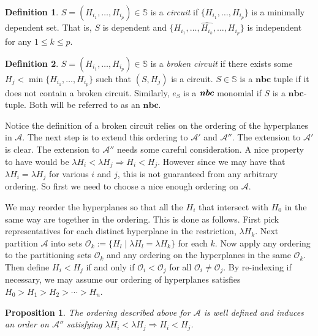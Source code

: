 \documentclass[article,twoside]{article}
\newcommand{\BB}[1]{\mathbb{#1}}
\newcommand{\script}[1]{\mathcal{#1}}
\newcommand{\tuples}{\BB{S}}
\newcommand{\NBC}{$\textbf{nbc}$}
\theoremstyle{plain}
\theoremstyle{plain}
\theoremstyle{plain}
\newtheorem{proposition}[proposition]{Proposition}
\theoremstyle{plain}
\theoremstyle{plain}
\theoremstyle{definition}
\newtheorem{definition}[definition]{Definition}
\theoremstyle{definition}
\theoremstyle{definition}
\theoremstyle{remark}
\theoremstyle{remark}
\begin{document}
\begin{definition}
	$S=(H_{i_1},\dots,H_{i_p})\in \tuples$ is a \emph{circuit} if $\{H_{i_1},\dots,H_{i_p}\}$ is a minimally dependent set. That is, $S$ is dependent and $\{H_{i_1},\dots,\hat{H_{i_k}},\dots,H_{i_p}\}$ is independent for any $1\leq k\leq p$.
\end{definition}

\begin{definition}
	$S=(H_{i_1},\dots,H_{i_p})\in \tuples$ is a \emph{broken circuit} if there exists some $H_j<\min\{H_{i_1},\dots,H_{i_p}\}$ such that $(S,H_j)$ is a circuit. $S\in\tuples$ is a \emph{\NBC} tuple if it does not contain a broken circuit. Similarly, $e_S$ is a $\emph{\NBC}$ monomial if $S$ is a \NBC-tuple. Both will be referred to as an \NBC.
\end{definition}





Notice the definition of a broken circuit relies on the ordering of the hyperplanes in $\script{A}$. The next step is to extend this ordering to $\script{A}'$ and $\script{A}''$. The extension to $\script{A}'$ is clear. The extension to $\script{A}''$ needs some careful consideration.  A nice property to have would be $\lambda H_i< \lambda H_j \Rightarrow H_i< H_j$. However since we may have that $\lambda H_i=\lambda H_j$ for various $i$ and $j$, this is not guaranteed from any arbitrary ordering. So first we need to choose a nice enough ordering on $\script{A}$.

We may reorder the hyperplanes so that all the $H_i$ that intersect with $H_0$ in the same way are together in the ordering. This is done as follows. First pick representatives for each distinct hyperplane in the restriction, $\lambda H_{k}$. Next partition $\script{A}$ into sets $\script{O}_k:=\{H_l \mid \lambda H_l = \lambda H_k\}$ for each $k$. Now apply any ordering to the partitioning sets $\script{O}_k$ and any ordering on the hyperplanes in the same $\script{O}_k$. Then define $H_i<H_j$ if and only if $\script{O}_i<\script{O}_j$ for all $\script{O}_i\neq\script{O}_j$. By re-indexing if necessary, we may assume our ordering of hyperplanes satisfies $H_0>H_1>H_2>\cdots>H_n$.

\begin{proposition}\label{induced-order}
	The ordering described above for $\script{A}$ is well defined and induces an order on $\script{A}''$ satisfying $\lambda H_i< \lambda H_j \Rightarrow H_i< H_j$.
\end{proposition}
\end{document}
